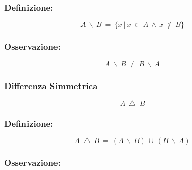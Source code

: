         \subsubsection*{Definizione:}
        
        \begin{LARGE}
            \begin{equation*}
                A\ \backslash\ B\ =\ \{x\ |\ x\ \in\ A\ \wedge\ x\ \notin\ B\}
            \end{equation*}
        \end{LARGE}

        \subsubsection*{Osservazione:}

        \begin{Large}
            \begin{equation*}
                A\ \backslash\ B\ \ne\ B\ \backslash\ A
            \end{equation*}
        \end{Large}

        \subsubsection{Differenza Simmetrica}
        \begin{LARGE}
            \begin{equation*}
                A\ \bigtriangleup\ B
            \end{equation*}
        \end{LARGE}
        
        \subsubsection*{Definizione:}
        
        \begin{LARGE}
            \begin{equation*}
                A\ \bigtriangleup\ B\ =\ (A\ \backslash\ B)\ \cup\ (B\ \backslash\ A)
            \end{equation*}
        \end{LARGE}

        \subsubsection*{Osservazione:}


